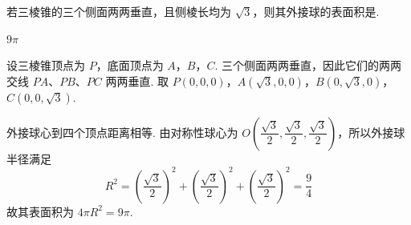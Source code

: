 \begin{problem}
若三棱锥的三个侧面两两垂直，且侧棱长均为 \( \sqrt{3} \)，则其外接球的表面积是\fillinblank{}.
\begin{answer}
\(9\pi\)
\end{answer}
\begin{solution}
设三棱锥顶点为 \(P\)，底面顶点为 \(A\)，\(B\)，\(C\). 三个侧面两两垂直，因此它们的两两交线 \(PA\)、\(PB\)、\(PC\) 两两垂直. 取
\(P(0,0,0)\)，\(A(\sqrt3,0,0)\)，\(B(0,\sqrt3,0)\)，\(C(0,0,\sqrt3)\).

外接球心到四个顶点距离相等. 由对称性球心为 \(O\left(\dfrac{\sqrt3}{2},\dfrac{\sqrt3}{2},\dfrac{\sqrt3}{2}\right)\)，所以外接球半径满足
\[
R^2=\left(\frac{\sqrt3}{2}\right)^2+\left(\frac{\sqrt3}{2}\right)^2+\left(\frac{\sqrt3}{2}\right)^2=\frac94
\]
故其表面积为 \(4\pi R^2=9\pi\).
\end{solution}
\end{problem}

